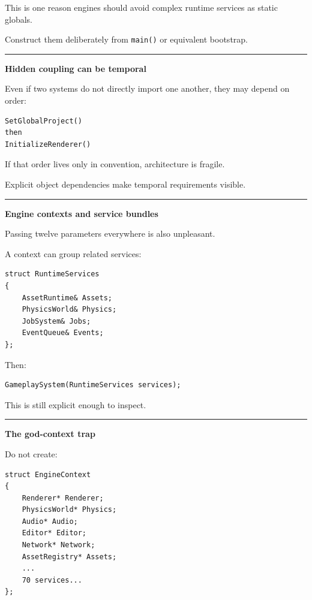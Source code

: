This is one reason engines should avoid complex runtime services as static globals.

Construct them deliberately from \texttt{main()} or equivalent bootstrap.

\begin{center}\rule{0.5\linewidth}{0.5pt}\end{center}

\textbf{Hidden coupling can be temporal}

Even if two systems do not directly import one another, they may depend on order:

\begin{verbatim}
SetGlobalProject()
then
InitializeRenderer()
\end{verbatim}

If that order lives only in convention, architecture is fragile.

Explicit object dependencies make temporal requirements visible.

\begin{center}\rule{0.5\linewidth}{0.5pt}\end{center}

\textbf{Engine contexts and service bundles}

Passing twelve parameters everywhere is also unpleasant.

A context can group related services:

\begin{verbatim}
struct RuntimeServices
{
    AssetRuntime& Assets;
    PhysicsWorld& Physics;
    JobSystem& Jobs;
    EventQueue& Events;
};
\end{verbatim}

Then:

\begin{verbatim}
GameplaySystem(RuntimeServices services);
\end{verbatim}

This is still explicit enough to inspect.

\begin{center}\rule{0.5\linewidth}{0.5pt}\end{center}

\textbf{The god-context trap}

Do not create:

\begin{verbatim}
struct EngineContext
{
    Renderer* Renderer;
    PhysicsWorld* Physics;
    Audio* Audio;
    Editor* Editor;
    Network* Network;
    AssetRegistry* Assets;
    ...
    70 services...
};
\end{verbatim}

